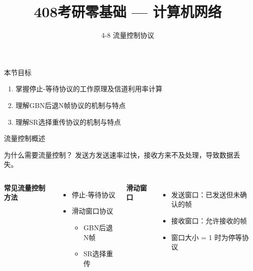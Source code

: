 \documentclass[10pt, aspectratio=169]{beamer}
\title{408考研零基础 --- 计算机网络}
\subtitle{4-8 流量控制协议}
\author{}
\date{}
\begin{document}
\begin{frame}{本节目标}
    \begin{enumerate}
        \item 掌握停止-等待协议的工作原理及信道利用率计算
        \item 理解GBN后退N帧协议的机制与特点
        \item 理解SR选择重传协议的机制与特点
    \end{enumerate}
\end{frame}

\begin{frame}{流量控制概述}
    \begin{block}{为什么需要流量控制？}
        发送方发送速率过快，接收方来不及处理，导致数据丢失。
    \end{block}
    \vspace{0.5em}
    \begin{columns}[t]
        \textbf{常见流量控制方法}
        \begin{itemize}
            \item 停止-等待协议
            \item 滑动窗口协议
            \begin{itemize}
                \item GBN后退N帧
                \item SR选择重传
            \end{itemize}
        \end{itemize}
        \textbf{滑动窗口}
        \begin{itemize}
            \item 发送窗口：已发送但未确认的帧
            \item 接收窗口：允许接收的帧
            \item 窗口大小 = 1 时为停等协议
        \end{itemize}
    \end{columns}
\end{frame}
\end{document}
